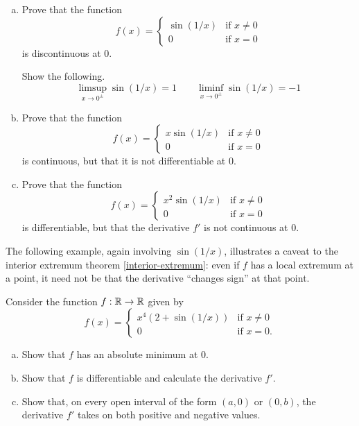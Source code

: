 \begin{exercise} \label{power-times-sine}
	\begin{enumerate}[(a)]
		\item Prove that the function \[ f(x) = \begin{cases} \sin(1/x) & \text{if } x \neq 0 \\ 0 & \text{if } x = 0 \end{cases} \]
		is discontinuous at 0. 
		
		\begin{hint}
			Show the following. 
			\[ \limsup_{x \to 0^{\pm}} \sin(1/x) = 1 \quad\quad \liminf_{x \to 0^{\pm}} \sin(1/x) = -1 \]
		\end{hint}
	
		\item Prove that the function \[ f(x) = \begin{cases} x\sin(1/x) & \text{if } x \neq 0 \\ 0 & \text{if } x = 0 \end{cases} \]
		is continuous, but that it is not differentiable at 0. 
		\item Prove that the function \[ f(x) = \begin{cases} x^2\sin(1/x) & \text{if } x \neq 0 \\ 0 & \text{if } x = 0 \end{cases} \]
		is differentiable, but that the derivative $f'$ is not continuous at 0.  
	\end{enumerate} 
\end{exercise}

The following example, again involving $\sin(1/x)$, illustrates a caveat to the interior extremum theorem \cref{interior-extremum}: even if $f$ has a local extremum at a point, it need not be that the derivative ``changes sign'' at that point.

\begin{exercise} \label{extremum-no-sign-change}
	Consider the function $f : \mathbb{R} \to \mathbb{R}$ given by 
	\[ f(x) = \begin{cases} x^4 \left( 2 + \sin(1/x) \right) & \text{if } x \neq 0 \\ 0 & \text{if } x = 0. \end{cases} \]
	\begin{enumerate}[(a)]
		\item Show that $f$ has an absolute minimum at 0. 
		\item Show that $f$ is differentiable and calculate the derivative $f'$. 
		\item Show that, on every open interval of the form $(a, 0)$ or $(0, b)$, the derivative $f'$ takes on both positive and negative values. 
	\end{enumerate}
\end{exercise}

